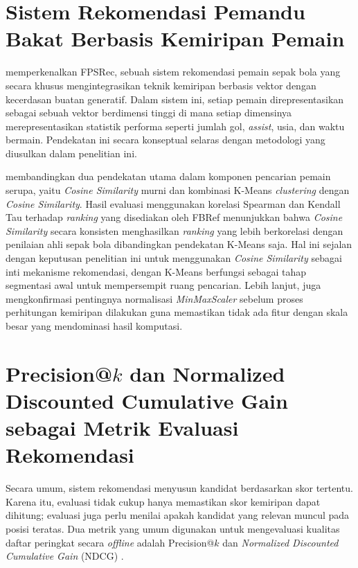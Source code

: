 \section{Sistem Rekomendasi Pemandu Bakat Berbasis Kemiripan Pemain}
\label{sec:sistem-rekomendasi}

\textcite{rinaldi2024} memperkenalkan FPSRec, sebuah sistem rekomendasi pemain sepak bola yang secara khusus mengintegrasikan teknik kemiripan berbasis vektor dengan kecerdasan buatan generatif. Dalam sistem ini, setiap pemain direpresentasikan sebagai sebuah vektor berdimensi tinggi di mana setiap dimensinya merepresentasikan statistik performa seperti jumlah gol, \emph{assist}, usia, dan waktu bermain. Pendekatan ini secara konseptual selaras dengan metodologi yang diusulkan dalam penelitian ini.

\textcite{rinaldi2024} membandingkan dua pendekatan utama dalam komponen pencarian pemain serupa, yaitu \emph{Cosine Similarity} murni dan kombinasi K-Means \emph{clustering} dengan \emph{Cosine Similarity}. Hasil evaluasi menggunakan korelasi Spearman dan Kendall Tau terhadap \emph{ranking} yang disediakan oleh FBRef menunjukkan bahwa \emph{Cosine Similarity} secara konsisten menghasilkan \emph{ranking} yang lebih berkorelasi dengan penilaian ahli sepak bola dibandingkan pendekatan K-Means saja. Hal ini sejalan dengan keputusan penelitian ini untuk menggunakan \emph{Cosine Similarity} sebagai inti mekanisme rekomendasi, dengan K-Means berfungsi sebagai tahap segmentasi awal untuk mempersempit ruang pencarian. Lebih lanjut, \textcite{rinaldi2024} juga mengkonfirmasi pentingnya normalisasi \emph{MinMaxScaler} sebelum proses perhitungan kemiripan dilakukan guna memastikan tidak ada fitur dengan skala besar yang mendominasi hasil komputasi.

\section{\texorpdfstring{Precision@$k$}{Precision@k} dan Normalized Discounted Cumulative Gain sebagai Metrik Evaluasi Rekomendasi}
\label{sec:precision-ndcg}

Secara umum, sistem rekomendasi menyusun kandidat berdasarkan skor tertentu. Karena itu, evaluasi tidak cukup hanya memastikan skor kemiripan dapat dihitung; evaluasi juga perlu menilai apakah kandidat yang relevan muncul pada posisi teratas. Dua metrik yang umum digunakan untuk mengevaluasi kualitas daftar peringkat secara \emph{offline} adalah Precision@$k$ dan \emph{Normalized Discounted Cumulative Gain} (NDCG) \parencite{manning2009}.

